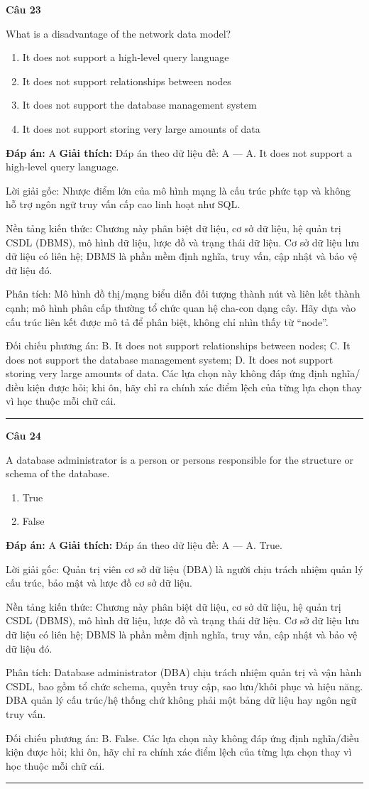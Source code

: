 \documentclass[11pt,a4paper]{article}
\newenvironment{question}[1]{%
  \par\vspace{1em}\noindent\textbf{\large Câu #1}\par\vspace{0.4em}
}{%
  \par\vspace{1em}\hrule\vspace{0.6em}
}
\newenvironment{choices}{%
  \begin{enumerate}[label=\textbf{\Alph*.},leftmargin=2.2em,itemsep=2pt,topsep=3pt]
}{%
  \end{enumerate}
}
\newcommand{\choice}{\item}
\begin{document}
\begin{question}{23}
What is a disadvantage of the network data model?
\begin{choices}
\choice It does not support a high-level query language
\choice It does not support relationships between nodes
\choice It does not support the database management system
\choice It does not support storing very large amounts of data
\end{choices}
\textbf{Đáp án:} A
\textbf{Giải thích:} Đáp án theo dữ liệu đề: A — A. It does not support a high-level query language.

Lời giải gốc: Nhược điểm lớn của mô hình mạng là cấu trúc phức tạp và không hỗ trợ ngôn ngữ truy vấn cấp cao linh hoạt như SQL.

Nền tảng kiến thức: Chương này phân biệt dữ liệu, cơ sở dữ liệu, hệ quản trị CSDL (DBMS), mô hình dữ liệu, lược đồ và trạng thái dữ liệu. Cơ sở dữ liệu lưu dữ liệu có liên hệ; DBMS là phần mềm định nghĩa, truy vấn, cập nhật và bảo vệ dữ liệu đó.

Phân tích: Mô hình đồ thị/mạng biểu diễn đối tượng thành nút và liên kết thành cạnh; mô hình phân cấp thường tổ chức quan hệ cha-con dạng cây. Hãy dựa vào cấu trúc liên kết được mô tả để phân biệt, không chỉ nhìn thấy từ “node”.

Đối chiếu phương án: B. It does not support relationships between nodes; C. It does not support the database management system; D. It does not support storing very large amounts of data. Các lựa chọn này không đáp ứng định nghĩa/điều kiện được hỏi; khi ôn, hãy chỉ ra chính xác điểm lệch của từng lựa chọn thay vì học thuộc mỗi chữ cái.
\end{question}

\begin{question}{24}
A database administrator is a person or persons responsible for the structure or schema of the database.
\begin{choices}
\choice True
\choice False
\end{choices}
\textbf{Đáp án:} A
\textbf{Giải thích:} Đáp án theo dữ liệu đề: A — A. True.

Lời giải gốc: Quản trị viên cơ sở dữ liệu (DBA) là người chịu trách nhiệm quản lý cấu trúc, bảo mật và lược đồ cơ sở dữ liệu.

Nền tảng kiến thức: Chương này phân biệt dữ liệu, cơ sở dữ liệu, hệ quản trị CSDL (DBMS), mô hình dữ liệu, lược đồ và trạng thái dữ liệu. Cơ sở dữ liệu lưu dữ liệu có liên hệ; DBMS là phần mềm định nghĩa, truy vấn, cập nhật và bảo vệ dữ liệu đó.

Phân tích: Database administrator (DBA) chịu trách nhiệm quản trị và vận hành CSDL, bao gồm tổ chức schema, quyền truy cập, sao lưu/khôi phục và hiệu năng. DBA quản lý cấu trúc/hệ thống chứ không phải một bảng dữ liệu hay ngôn ngữ truy vấn.

Đối chiếu phương án: B. False. Các lựa chọn này không đáp ứng định nghĩa/điều kiện được hỏi; khi ôn, hãy chỉ ra chính xác điểm lệch của từng lựa chọn thay vì học thuộc mỗi chữ cái.
\end{question}
\end{document}
